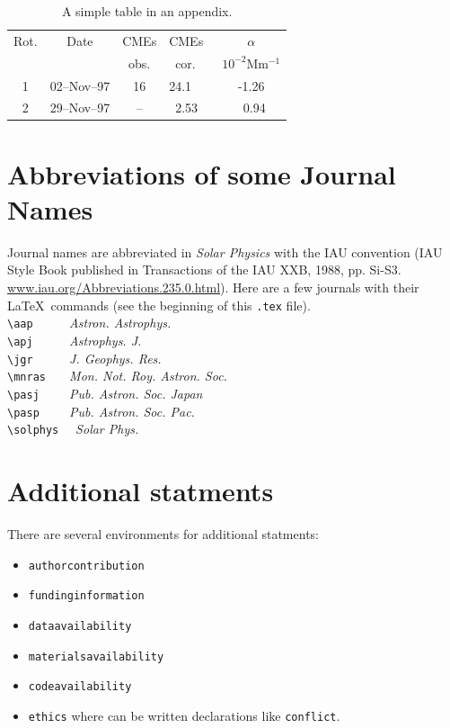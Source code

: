\documentclass[namedreferences]{solarphysics}
\newcommand{\aap}{    {\it Astron. Astrophys.}}
\newcommand{\apj}{    {\it Astrophys. J.}}
\newcommand{\jgr}{    {\it J. Geophys. Res.}}
\newcommand{\mnras}{  {\it Mon. Not. Roy. Astron. Soc.}}
\newcommand{\pasp}{   {\it Pub. Astron. Soc. Pac.}}
\newcommand{\pasj}{   {\it Pub. Astron. Soc. Japan}}
\newcommand{\solphys}{{\it Solar Phys.}}
\begin{document}
\begin{article}
  \begin{table}
   \caption{ A simple table in an appendix. }
   \label{T-appendix}
    \begin{tabular}{ccclc}     %
      \hline                   %
    Rot. & Date & CMEs & CMEs~ & $\alpha$ \\
         &      & obs. & ~cor. & $10^{-2}$Mm$^{-1}$\\
      \hline
    1 & 02--Nov--97 & 16  & 24.1  & -1.26 \\
    2 & 29--Nov--97 & --  & ~2.53 & ~0.94 \\
      \hline
    \end{tabular}
   \end{table}


\section{Abbreviations of some Journal Names} %
    \label{S-appendix}
Journal names are abbreviated in {\it Solar Physics} with the IAU
convention (IAU Style Book
published in Transactions of the IAU XXB, 1988, pp. Si-S3.
\url{www.iau.org/Abbreviations.235.0.html}).  Here are a few journals with their \LaTeX\ 
commands (see the beginning of this \texttt{.tex} file).\\
  \verb+\aap     + \aap \\
  \verb+\apj     + \apj \\
  \verb+\jgr     + \jgr \\
  \verb+\mnras   + \mnras \\
  \verb+\pasj    + \pasj \\
  \verb+\pasp    + \pasp \\
  \verb+\solphys +~ \solphys 


\section{Additional statments}

There are several environments for additional statments: 
\begin{itemize}
\item \texttt{authorcontribution}
\item \texttt{fundinginformation}
\item \texttt{dataavailability}
\item \texttt{materialsavailability}
\item \texttt{codeavailability}
\item \texttt{ethics} where can be written declarations like \texttt{conflict}.
\end{itemize}
 

\end{article}
\end{document}

